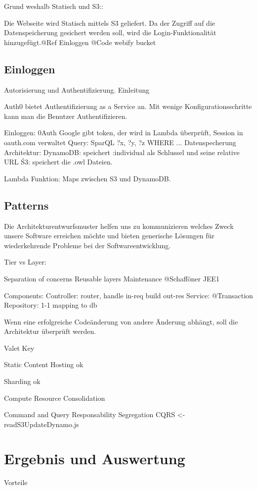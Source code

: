 \documentclass[
12pt,
english,
ngerman,
headsepline,
twoside,
openright,
numbers=noenddot,version=first
]{scrreprt}
\begin{document}
Grund weshalb Statisch und S3:: 

Die Webseite wird Statisch mittels S3 geliefert. Da der Zugriff auf die Datenspeicherung gesichert werden soll, wird die  Login-Funktionalität hinzugefügt.@Ref Einloggen
@Code webify bucket



\section{Einloggen}

Autorisierung und Authentifizierung. Einleitung

Auth0 bietet Authentifizierung as a Service an. Mit wenige Konfigurationsschritte kann man die Benutzer Authentifizieren. 


Einloggen: 0Auth Google gibt token, der wird in Lambda überprüft, Session in oauth.com verwaltet
Query: SparQL ?x, ?y, ?z WHERE ...
Datenspecherung Architektur:
DynamoDB: speichert :individual als Schlussel und seine relative URL
Ś3: speichert die .owl Dateien.

Lambda Funktion: Maps zwischen S3 und DynamoDB.

\section{Patterns}

Die Architekturentwurfsmuster helfen uns zu kommunizieren welches Zweck unsere Software erreichen möchte und bieten generische Lösungen für wiederkehrende Probleme bei der Softwareentwicklung.

Tier vs Layer: \cite{sbarski2017serverless}

Separation of concerns
Reusable layers
Maintenance @Schafföner JEE1

Components: 
Controller: router, handle in-req build out-res
Service: @Transaction
Repository: 1-1 mapping to db

Wenn eine erfolgreiche Codeänderung von andere Änderung abhängt, soll die Architektur überprüft werden. 

Valet Key \cite{homer2014cloud}

Static Content Hosting ok

Sharding ok

Compute Resource Consolidation 

Command and Query Responsability Segregation CQRS <- readS3UpdateDynamo.js

\chapter{Ergebnis und Auswertung}
Vorteile
\end{document}
